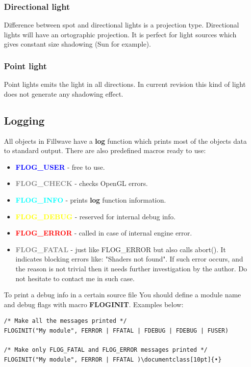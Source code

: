 \documentclass{article}
\begin{document}
\subsubsection{Directional light}\label{sec:Directional light}
\indent \indent Difference between spot and directional lights is a projection type. Directional lights will have an ortographic projection. It is perfect for light sources which gives constant size shadowing (Sun for example).

\subsubsection{Point light}\label{sec:Point light}
\indent \indent Point lights emits the light in all directions. In current revision this kind of light does not generate any shadowing effect.

\subsection{Logging}\label{sec:Logging}
\indent \indent All objects in Fillwave have a \textbf{log} function which prints most of the objects data to standard output. There are also predefined macros ready to use:

\begin{itemize}
\item \textbf{\textcolor{blue}{FLOG\_USER}} - free to use.
\item \textbf{\textcolor{gray}{FLOG\_CHECK}} - checks OpenGL errors.
\item \textbf{\textcolor{cyan}{FLOG\_INFO}} - prints \textbf{log} function information.
\item \textbf{\textcolor{yellow}{FLOG\_DEBUG}} - reserved for internal debug info.
\item \textbf{\textcolor{red}{FLOG\_ERROR}} - called in case of internal engine error.
\item \textbf{\textcolor{gray}{FLOG\_FATAL}} - just like FLOG\_ERROR but also calls abort(). It indicates blocking errors like: "Shaders not found". If such error occurs, and the reason is not trivial then it needs further investigation by the author. Do not hesitate to contact me in such case.
\end{itemize}
\indent To print a debug info in a certain source file You should define a module name and debug flags with macro \textbf{FLOGINIT}. Examples below:
\begin{lstlisting}
/* Make all the messages printed */
FLOGINIT("My module", FERROR | FFATAL | FDEBUG | FDEBUG | FUSER)

/* Make only FLOG_FATAL and FLOG_ERROR messages printed */
FLOGINIT("My module", FERROR | FFATAL )\documentclass[10pt]{•}
\end{lstlisting}
\end{document}
